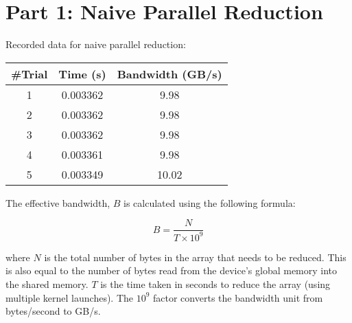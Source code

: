 \section{Part 1: Naive Parallel Reduction}
\label{sec:part1}

Recorded data for naive parallel reduction:

\begin{center}
	\begin{tabular}{||c c c||} 
		\hline
		\#Trial & Time (s) & Bandwidth (GB/s) \\ [0.5ex] 
		\hline\hline
		1 & 0.003362 & 9.98 \\ 
		\hline
		2 & 0.003362 & 9.98 \\
		\hline
		3 & 0.003362 & 9.98 \\
		\hline
		4 & 0.003361 & 9.98 \\
		\hline
		5 & 0.003349 & 10.02 \\
		\hline
	\end{tabular}
\end{center}

The effective bandwidth, $B$ is calculated using the following formula:

\[ B = \dfrac{N}{T \times 10^9}  \]

where $N$ is the total number of bytes in the array that needs to be reduced. This is also equal to the number of bytes read from the device's global memory into the shared memory. $T$ is the time taken in seconds to reduce the array (using multiple kernel launches). The $10^9$ factor converts the bandwidth unit from bytes/second to GB/s.





